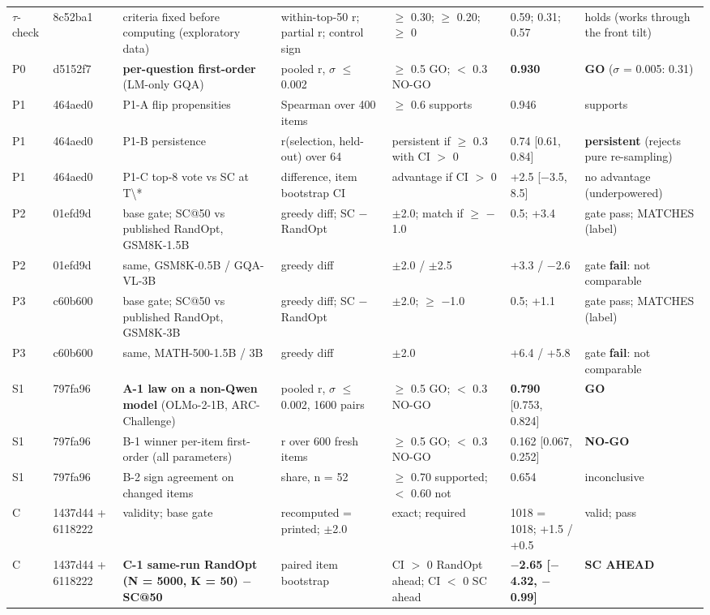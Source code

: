 \begin{longtable}{p{1.2cm}p{1.3cm}p{3.8cm}p{2.1cm}p{2.1cm}p{2.4cm}p{2.7cm}}
$\tau$-check & 8c52ba1 & criteria fixed before computing (exploratory data) & within-top-50 r; partial r; control sign & $\ge$ 0.30; $\ge$ 0.20; $\ge$ 0 & 0.59; 0.31; 0.57 & holds (works through the front tilt) \\
P0 & d5152f7 & \textbf{per-question first-order} (LM-only GQA) & pooled r, $\sigma$ $\le$ 0.002 & $\ge$ 0.5 GO; $<$ 0.3 NO-GO & \textbf{0.930} & \textbf{GO} ($\sigma$ = 0.005: 0.31) \\
P1 & 464aed0 & P1-A flip propensities & Spearman over 400 items & $\ge$ 0.6 supports & 0.946 & supports \\
P1 & 464aed0 & P1-B persistence & r(selection, held-out) over 64 & persistent if $\ge$ 0.3 with CI $>$ 0 & 0.74 [0.61, 0.84] & \textbf{persistent} (rejects pure re-sampling) \\
P1 & 464aed0 & P1-C top-8 vote vs SC at T\textbackslash{}* & difference, item bootstrap CI & advantage if CI $>$ 0 & +2.5 [$-$3.5, 8.5] & no advantage (underpowered) \\
P2 & 01efd9d & base gate; SC@50 vs published RandOpt, GSM8K-1.5B & greedy diff; SC $-$ RandOpt & $\pm$2.0; match if $\ge$ $-$1.0 & 0.5; +3.4 & gate pass; MATCHES (label) \\
P2 & 01efd9d & same, GSM8K-0.5B / GQA-VL-3B & greedy diff & $\pm$2.0 / $\pm$2.5 & +3.3 / $-$2.6 & gate \textbf{fail}: not comparable \\
P3 & c60b600 & base gate; SC@50 vs published RandOpt, GSM8K-3B & greedy diff; SC $-$ RandOpt & $\pm$2.0; $\ge$ $-$1.0 & 0.5; +1.1 & gate pass; MATCHES (label) \\
P3 & c60b600 & same, MATH-500-1.5B / 3B & greedy diff & $\pm$2.0 & +6.4 / +5.8 & gate \textbf{fail}: not comparable \\
S1 & 797fa96 & \textbf{A-1 law on a non-Qwen model} (OLMo-2-1B, ARC-Challenge) & pooled r, $\sigma$ $\le$ 0.002, 1600 pairs & $\ge$ 0.5 GO; $<$ 0.3 NO-GO & \textbf{0.790} [0.753, 0.824] & \textbf{GO} \\
S1 & 797fa96 & B-1 winner per-item first-order (all parameters) & r over 600 fresh items & $\ge$ 0.5 GO; $<$ 0.3 NO-GO & 0.162 [0.067, 0.252] & \textbf{NO-GO} \\
S1 & 797fa96 & B-2 sign agreement on changed items & share, n = 52 & $\ge$ 0.70 supported; $<$ 0.60 not & 0.654 & inconclusive \\
C & 1437d44 + 6118222 & validity; base gate & recomputed = printed; $\pm$2.0 & exact; required & 1018 = 1018; +1.5 / +0.5 & valid; pass \\
C & 1437d44 + 6118222 & \textbf{C-1 same-run RandOpt (N = 5000, K = 50) $-$ SC@50} & paired item bootstrap & CI $>$ 0 RandOpt ahead; CI $<$ 0 SC ahead & \textbf{$-$2.65 [$-$4.32, $-$0.99]} & \textbf{SC AHEAD} \\

\end{longtable}
